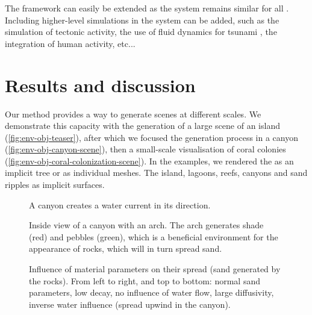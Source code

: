 \midConclusion

The framework can easily be extended as the  system remains similar for all . Including higher-level simulations in the  system can be added, such as the simulation of tectonic activity, the use of fluid dynamics for tsunami , the integration of human activity, etc...

\section{Results and discussion}
\label{sec:env-obj-results}
Our method provides a way to generate scenes at different scales. We demonstrate this capacity with the generation of a large scene of an island (\cref{fig:env-obj-teaser}), after which we focused the generation process in a canyon (\cref{fig:env-obj-canyon-scene}), then a small-scale visualisation of coral colonies (\cref{fig:env-obj-coral-colonization-scene}).
In the examples, we rendered the  as an implicit tree or as individual meshes. The island, lagoons, reefs, canyons and sand ripples as implicit surfaces.

\begin{figure}
    \caption{A canyon creates a water current in its direction.}
    \label{fig:env-obj-canyon-flow}
\end{figure}

\begin{figure}
    \caption{Inside view of a canyon with an arch. The arch generates shade (red) and pebbles (green), which is a beneficial environment for the appearance of rocks, which will in turn spread sand.}
    \label{fig:env-obj-canyon-inside-with-arch}
\end{figure}

\begin{figure}
    \caption{Influence of material parameters on their spread (sand generated by the rocks). From left to right, and top to bottom: normal sand parameters, low decay, no influence of water flow, large diffusivity, inverse water influence (spread upwind in the canyon).}
    \label{fig:env-obj-material-diffusion-parameters}
\end{figure}

